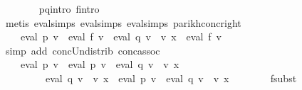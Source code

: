 \begin{isabellebody}
\ \ \ \ \ \ \isamarkupfalse%
\ p{}{\isacharunderscore}{\kern0pt}q{}{\isacharunderscore}{\kern0pt}intro\ f{}{\isacharprime}{\kern0pt}{\isacharunderscore}{\kern0pt}intro\isanewline
\ \ \ \ \ \ \isamarkupfalse%
\ {\isacharparenleft}{\kern0pt}metis\ eval{\isachardot}{\kern0pt}simps{\isacharparenleft}{\kern0pt}{}{\isacharparenright}{\kern0pt}\ eval{\isachardot}{\kern0pt}simps{\isacharparenleft}{\kern0pt}{}{\isacharparenright}{\kern0pt}\ eval{\isachardot}{\kern0pt}simps{\isacharparenleft}{\kern0pt}{}{\isacharparenright}{\kern0pt}\ parikh{\isacharunderscore}{\kern0pt}conc{\isacharunderscore}{\kern0pt}right{\isacharparenright}{\kern0pt}\isanewline
\ \ \ \ \isamarkupfalse%
\ \isamarkupfalse%
\ {\isachardoublequoteopen}{\isasymdots}\ {\isacharequal}{\kern0pt}\ {\isasymPsi}\ {\isacharparenleft}{\kern0pt}eval\ p{}\ v\ {\isacharat}{\kern0pt}{\isacharat}{\kern0pt}\ eval\ f{}\ v\ {\isasymunion}\ eval\ q{}\ v\ {\isacharat}{\kern0pt}{\isacharat}{\kern0pt}\ v\ x\ {\isacharat}{\kern0pt}{\isacharat}{\kern0pt}\ eval\ f{}\ v{\isacharparenright}{\kern0pt}{\isachardoublequoteclose}\isanewline
\ \ \ \ \ \ \isamarkupfalse%
\ {\isacharparenleft}{\kern0pt}simp\ add{\isacharcolon}{\kern0pt}\ conc{\isacharunderscore}{\kern0pt}Un{\isacharunderscore}{\kern0pt}distrib{\isacharparenleft}{\kern0pt}{}{\isacharparenright}{\kern0pt}\ conc{\isacharunderscore}{\kern0pt}assoc{\isacharparenright}{\kern0pt}\isanewline
\ \ \ \ \isamarkupfalse%
\ \isamarkupfalse%
\ {\isachardoublequoteopen}{\isasymdots}\ {\isacharequal}{\kern0pt}\ {\isasymPsi}\ {\isacharparenleft}{\kern0pt}eval\ p{}\ v\ {\isacharat}{\kern0pt}{\isacharat}{\kern0pt}\ {\isacharparenleft}{\kern0pt}eval\ p{}\ v\ {\isasymunion}\ eval\ q{}\ v\ {\isacharat}{\kern0pt}{\isacharat}{\kern0pt}\ v\ x{\isacharparenright}{\kern0pt}\isanewline
\ \ \ \ \ \ \ \ {\isasymunion}\ eval\ q{}\ v\ {\isacharat}{\kern0pt}{\isacharat}{\kern0pt}\ v\ x\ {\isacharat}{\kern0pt}{\isacharat}{\kern0pt}\ {\isacharparenleft}{\kern0pt}eval\ p{}\ v\ {\isasymunion}\ eval\ q{}\ v\ {\isacharat}{\kern0pt}{\isacharat}{\kern0pt}\ v\ x{\isacharparenright}{\kern0pt}{\isacharparenright}{\kern0pt}{\isachardoublequoteclose}\isanewline
\ \ \ \ \ \ \isamarkupfalse%
\ f{}{\isacharunderscore}{\kern0pt}subst\ \isamarkupfalse%

\end{isabellebody}
